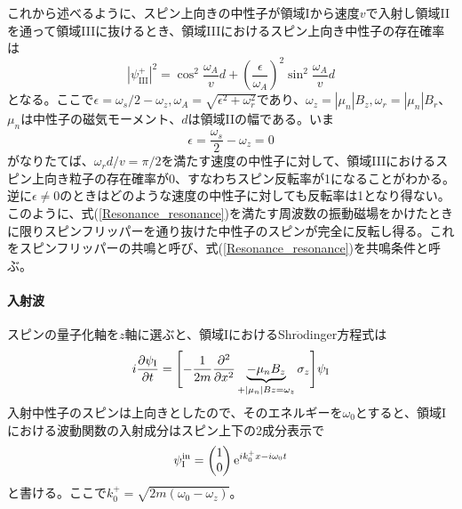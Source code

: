 これから述べるように、スピン上向きの中性子が領域Iから速度$v$で入射し領域IIを通って領域IIIに抜けるとき、領域IIIにおけるスピン上向き中性子の存在確率は
\begin{equation}
|\psi_{\mathrm{III}}^+|^2=\cos^2 \frac{\omega_A}{v}d+\left(\frac{\epsilon}{\omega_A}\right)^2\sin^2\frac{\omega_A}{v}d \label{Resonance_flip}
\end{equation}
となる。ここで$\epsilon=\omega_s/2-\omega_z,\omega_A=\sqrt{\epsilon^2+\omega_r^2}$であり、$\omega_z=|\mu_n|B_z,\omega_r=|\mu_n|B_r$、$\mu_n$は中性子の磁気モーメント、$d$は領域IIの幅である。いま
\begin{equation}
\epsilon=\frac{\omega_s}{2}-\omega_z=0 \label{Resonance_resonance}
\end{equation}
がなりたてば、$\omega_rd/v=\pi/2$を満たす速度の中性子に対して、領域IIIにおけるスピン上向き粒子の存在確率が0、すなわちスピン反転率が1になることがわかる。逆に$\epsilon \neq 0$のときはどのような速度の中性子に対しても反転率は1となり得ない。このように、式(\ref{Resonance_resonance})を満たす周波数の振動磁場をかけたときに限りスピンフリッパーを通り抜けた中性子のスピンが完全に反転し得る。これをスピンフリッパーの共鳴と呼び、式(\ref{Resonance_resonance})を共鳴条件と呼ぶ。

\renewcommand{\arraystretch}{1.5}



\paragraph{入射波}
スピンの量子化軸を$z$軸に選ぶと、領域IにおけるShr$\ddot{\mathrm{o}}$dinger方程式は%
\begin{equation}
i\frac{\partial \psi_\mathrm{I}}{\partial t}= \Biggl[-\frac{1}{2m} \frac{\partial^2}{\partial x^2} \underbrace{-\mu_nB_z}_{+|\mu_n|Bz =\omega_z} \sigma_z\Biggr] \psi_\mathrm{I}
\end{equation}
入射中性子のスピンは上向きとしたので、そのエネルギーを$\omega_0$とすると、領域Iにおける波動関数の入射成分はスピン上下の2成分表示で
\begin{equation}
\psi_\mathrm{I}^{\mathrm{in}}=\begin{pmatrix} 1\\0 \end{pmatrix} \mathrm{e}^{i k_0^+ x -i\omega_0 t}
\end{equation}
と書ける。ここで$k_0^+=\sqrt{2m(\omega_0 -\omega_z)}$。
\renewcommand{\arraystretch}{1}


